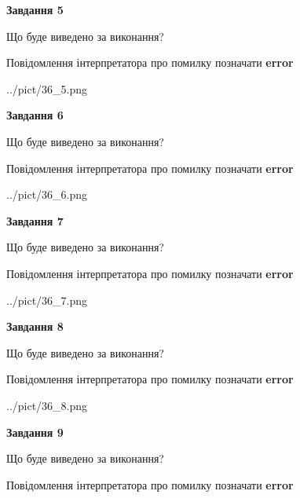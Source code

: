 \documentclass[11pt, ukrainian]{article}
\begin{document}
{\begin {large}
{\begin {center}\textbf{Завдання 5}\end {center}}\par
Що буде виведено за виконання? \par
Повідомлення інтерпретатора про помилку позначати \textbf{error}

\begin{center}
	{../pict/36_5.png}
\end{center}
\newpage

{\begin {center}\textbf{Завдання 6}\end {center}}\par
Що буде виведено за виконання? \par
Повідомлення інтерпретатора про помилку позначати \textbf{error}

\begin{center}
	{../pict/36_6.png}
\end{center}
\newpage

{\begin {center}\textbf{Завдання 7}\end {center}}\par
Що буде виведено за виконання? \par
Повідомлення інтерпретатора про помилку позначати \textbf{error}

\begin{center}
	{../pict/36_7.png}
\end{center}
\newpage

{\begin {center}\textbf{Завдання 8}\end {center}}\par
Що буде виведено за виконання? \par
Повідомлення інтерпретатора про помилку позначати \textbf{error}

\begin{center}
	{../pict/36_8.png}
\end{center}
\newpage

{\begin {center}\textbf{Завдання 9}\end {center}}\par
Що буде виведено за виконання? \par
Повідомлення інтерпретатора про помилку позначати \textbf{error}


\end{large}}
\end{document}
